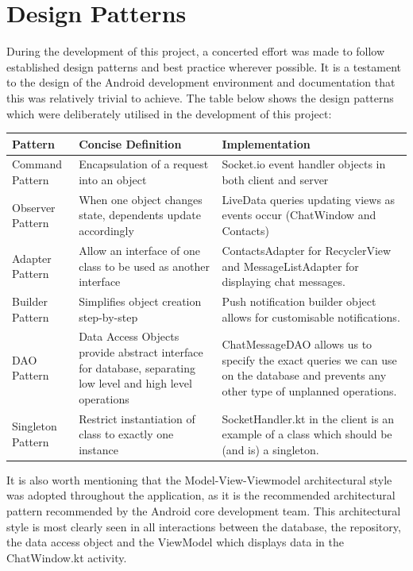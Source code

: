\documentclass{mproj}
\begin{document}
\section{Design Patterns}
During the development of this project, a concerted effort was made to follow established design patterns and best practice wherever possible. It is a testament to the design of the Android development environment and documentation that this was relatively trivial to achieve. The table below shows the design patterns which were deliberately utilised in the development of this project:
\begin{center}
\begin{tabular}{ |p{4cm}|p{4.5cm}|p{5.0cm}|}
	\hline
	Pattern & Concise Definition & Implementation\\
	\hline
	Command Pattern\cite{sarcar2020command} & Encapsulation of a request into an object  & Socket.io event handler objects in both client and server\\
	\hline
	Observer Pattern\cite{eales2005observer} & When one object changes state, dependents update accordingly & LiveData queries updating views as events occur (ChatWindow and Contacts)\\
	\hline
	Adapter Pattern\cite{harmes2008adapter} & Allow an interface of one class to be used as another interface & ContactsAdapter for RecyclerView and MessageListAdapter for displaying chat messages.\\
	\hline
	Builder Pattern\cite{sarcar2016builder} & Simplifies object creation step-by-step & Push notification builder object allows for customisable notifications.\\
	\hline
	DAO Pattern\cite{berger2005data} & Data Access Objects provide abstract interface for database, separating low level and high level operations & ChatMessageDAO allows us to specify the exact queries we can use on the database and prevents any other type of unplanned operations.\\
	\hline
	Singleton Pattern\cite{stencel2008implementation} & Restrict instantiation of class to exactly one instance & SocketHandler.kt in the client is an example of a class which should be (and is) a singleton.\\
	\hline
\end{tabular}
\end{center}
It is also worth mentioning that the Model-View-Viewmodel architectural style was adopted throughout the application, as it is the recommended architectural pattern recommended by the Android core development team\cite{androiddevelopers}. 
This architectural style is most clearly seen in all interactions between the database, the repository, the data access object and the ViewModel which displays data in the ChatWindow.kt activity.
\end{document}
